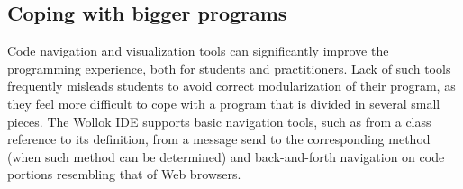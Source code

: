 %
%
%



\subsection{Coping with bigger programs}
Code navigation and visualization tools can significantly improve the programming experience, 
both for students and practitioners.
Lack of such tools frequently misleads students to avoid correct modularization of their program, 
as they feel more difficult to cope with a program that is divided in several small pieces.
The Wollok IDE supports basic navigation tools, such as 
from a class reference to its definition, 
from a message send to the corresponding method (when such method can be determined) 
and back-and-forth navigation on code portions resembling that of Web browsers.

